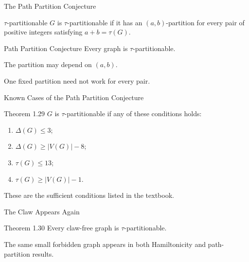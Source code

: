 \documentclass[aspectratio=169,11pt]{beamer}
\begin{document}
\begin{frame}{The Path Partition Conjecture}
\large
\begin{block}{$\tau$-partitionable}
$G$ is $\tau$-partitionable if it has an $(a,b)$-partition for every pair of positive integers satisfying $a+b=\tau(G)$.
\end{block}
\begin{block}{Path Partition Conjecture}
Every graph is $\tau$-partitionable.
\end{block}
\medskip The partition may depend on $(a,b)$.\par\smallskip One fixed partition need not work for every pair.
\end{frame}

\begin{frame}{Known Cases of the Path Partition Conjecture}
\large
\begin{block}{Theorem 1.29}
$G$ is $\tau$-partitionable if any of these conditions holds:\begin{enumerate}\item $\Delta(G)\le3$;\item $\Delta(G)\ge |V(G)|-8$;\item $\tau(G)\le13$;\item $\tau(G)\ge |V(G)|-1$.\end{enumerate}
\end{block}
\medskip These are the sufficient conditions listed in the textbook.
\end{frame}

\begin{frame}{The Claw Appears Again}
\large
\begin{block}{Theorem 1.30}
Every claw-free graph is $\tau$-partitionable.
\end{block}
\begin{center}\end{center}\medskip The same small forbidden graph appears in both Hamiltonicity and path-partition results.
\end{frame}
\end{document}
